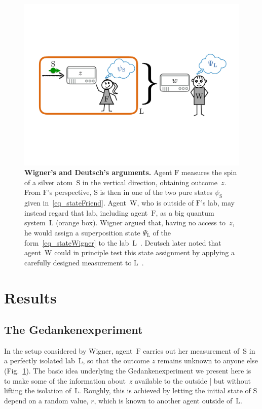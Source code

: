 \documentclass[12pt]{article}
\theoremstyle{mystyle}
\theoremstyle{definition}
\newcommand*{\Friend}{\mathrm{F}}
\newcommand*{\Lab}{\mathrm{L}}
\newcommand*{\Labtwo}{\mathrm{L}}
\newcommand*{\Wigner}{\mathrm{W}}
\newcommand*{\Spin}{\mathrm{S}}
\begin{document}
  \begin{figure}[t]
\centering
\includegraphics[trim= 0.4cm  8.4cm 0cm 8cm, clip=true, scale=0.2]{WFStandardR.pdf}
\caption{{\bf Wigner's and Deutsch's arguments.} Agent $\Friend$ measures the spin of a silver atom~$\Spin$ in the vertical direction, obtaining outcome~$z$. From $\Friend$'s perspective, $\Spin$ is then in one of the two pure states  $\psi_{\Spin}$ given in~\eqref{eq_stateFriend}.  Agent~$\Wigner$, who is outside of $\Friend$'s lab, may instead regard that lab, including agent~$\Friend$, as a big quantum system~$\Lab$ (orange box). Wigner argued that, having no access to~$z$, he would assign a superposition state $\Psi_{\Lab}$ of the form~\eqref{eq_stateWigner} to the lab~$\Lab$~\cite{Wigner67}. Deutsch later noted that agent~$\Wigner$ could in principle test this state assignment by applying a carefully designed measurement to $\Lab$~\cite{Deutsch85}. 
\label{fig_WFStandard}
}
\end{figure} 

\section{Results}

\subsection{The Gedankenexperiment} \label{sec_experiment}

In the setup considered by Wigner,  agent~$\Friend$ carries out her measurement of~$\Spin$ in a perfectly isolated lab~$\Labtwo$, so that the outcome $z$ remains unknown to anyone else  (Fig.~\ref{fig_WFStandard}). The basic idea underlying the Gedankenexperiment we present here is to make some of the information about~$z$ available to the outside | but without lifting the isolation of~$\Labtwo$. Roughly, this is achieved by letting the initial state of $\Spin$ depend on a random value, $r$, which is known to another agent outside of~$\Labtwo$.
\end{document}

